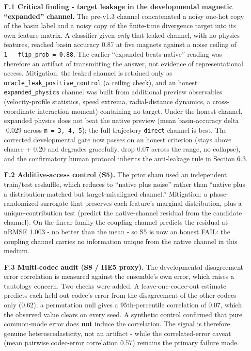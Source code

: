 \documentclass[
  11pt,
]{article}
\begin{document}
\textbf{F.1 Critical finding - target leakage in
the developmental magnetic ``expanded''
channel.} The pre-v1.3 channel concatenated a
noisy one-hot copy of the basin label and a
noisy copy of the finite-time divergence target
into its own feature matrix. A classifier given
\emph{only} that leaked channel, with no physics
features, reached basin accuracy 0.87 at five
magnets against a noise ceiling of
\texttt{1\ -\ flip\_prob\ =\ 0.88}. The earlier
``expanded beats native'' reading was therefore
an artifact of transmitting the answer, not
evidence of representational access. Mitigation:
the leaked channel is retained only as
\texttt{oracle\_leak\_positive\_control} (a
ceiling check), and an honest
\texttt{expanded\_physics} channel was built
from additional preview observables
(velocity-profile statistics, speed extrema,
radial-distance dynamics, a cross-coordinate
interaction moment) containing no target. Under
the honest channel, expanded physics does not
beat the native preview (mean basin-accuracy
delta -0.029 across \texttt{m\ =\ 3,\ 4,\ 5});
the full-trajectory \texttt{direct} channel is
best. The corrected developmental gate now
passes on an honest criterion (stays above
chance + 0.20 and degrades gracefully, drop 0.07
across the range, no collapse), and the
confirmatory human protocol inherits the
anti-leakage rule in Section 6.3.

\textbf{F.2 Additive-access control (S5).} The
prior sham used an independent train/test
reshuffle, which reduces to ``native plus
noise'' rather than ``native plus a
distribution-matched but target-misaligned
channel.'' Mitigation: a phase-randomized
surrogate that preserves each feature's marginal
distribution, plus a unique-contribution test
(predict the native-channel residual from the
candidate channel). On the linear family the
coupling channel predicts the residual at nRMSE
1.003 - no better than the mean - so S5 is now
an honest FAIL: the coupling channel carries no
information unique from the native channel in
this medium.

\textbf{F.3 Multi-codec audit (S8 / HE5 proxy).}
The developmental disagreement-error correlation
is measured against the ensemble's own error,
which raises a tautology concern. Two checks
were added. A leave-one-codec-out estimate
predicts each held-out codec's error from the
disagreement of the other codecs only (0.62); a
permutation null gives a 95th-percentile
correlation of 0.07, which the observed value
clears on every seed. A synthetic control
confirmed that pure common-mode error does
\textbf{not} induce the correlation. The signal
is therefore genuine heteroscedasticity, not an
artifact - while the correlated-error caveat
(mean pairwise codec-error correlation 0.57)
remains the primary failure mode.
\end{document}
